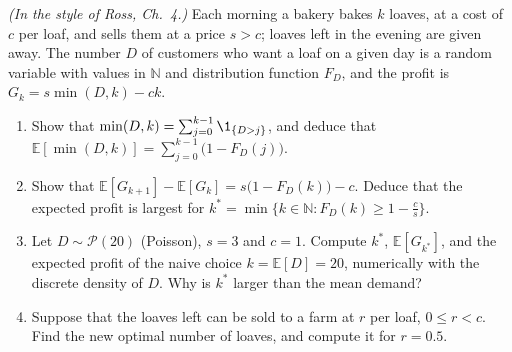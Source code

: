\begin{exercise}\label{ex:ld-newsvendor}
\medium \emph{(In the style of Ross, Ch.~4.)} Each morning a bakery bakes $k$ loaves, at a cost of
$c$ per loaf, and sells them at a price $s>c$; loaves left in the evening are given away. The
number $D$ of customers who want a loaf on a given day is a random variable with values in
$\mathbb N$ and distribution function $F_D$, and the profit is $G_k=s\min(D,k)-ck$.
\begin{enumerate}[label=(\alph*)]
  \item Show that $\min(D,k)=\sum_{j=0}^{k-1}\1_{\{D>j\}}$, and deduce that
    $\mathbb E[\min(D,k)]=\sum_{j=0}^{k-1}\big(1-F_D(j)\big)$.
  \item Show that $\mathbb E[G_{k+1}]-\mathbb E[G_k]=s\big(1-F_D(k)\big)-c$. Deduce that the expected
    profit is largest for $k^*=\min\{k\in\mathbb N:F_D(k)\ge1-\frac cs\}$.
  \item Let $D\sim\mathcal P(20)$ (Poisson), $s=3$ and $c=1$. Compute $k^*$, $\mathbb E[G_{k^*}]$, and
    the expected profit of the naive choice $k=\mathbb E[D]=20$, numerically with the discrete density
    of $D$. Why is $k^*$ larger than the mean demand?
  \item Suppose that the loaves left can be sold to a farm at $r$ per loaf, $0\le r<c$. Find the new
    optimal number of loaves, and compute it for $r=0.5$.
\end{enumerate}
\end{exercise}

